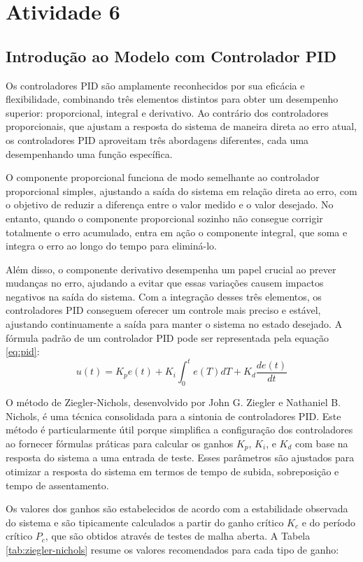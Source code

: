 \section{Atividade 6}
\subsection{Introdução ao Modelo com Controlador PID}
Os controladores PID são amplamente reconhecidos por sua eficácia e flexibilidade, combinando três elementos distintos para obter um desempenho superior: proporcional, integral e derivativo. Ao contrário dos controladores proporcionais, que ajustam a resposta do sistema de maneira direta ao erro atual, os controladores PID aproveitam três abordagens diferentes, cada uma desempenhando uma função específica.

O componente proporcional funciona de modo semelhante ao controlador proporcional simples, ajustando a saída do sistema em relação direta ao erro, com o objetivo de reduzir a diferença entre o valor medido e o valor desejado. No entanto, quando o componente proporcional sozinho não consegue corrigir totalmente o erro acumulado, entra em ação o componente integral, que soma e integra o erro ao longo do tempo para eliminá-lo.

Além disso, o componente derivativo desempenha um papel crucial ao prever mudanças no erro, ajudando a evitar que essas variações causem impactos negativos na saída do sistema. Com a integração desses três elementos, os controladores PID conseguem oferecer um controle mais preciso e estável, ajustando continuamente a saída para manter o sistema no estado desejado.
A fórmula padrão de um controlador PID pode ser representada pela equação \ref{eq:pid}:
\begin{equation}
u(t) = K_p e(t) + K_i \int_{0}^{t} e(T) dT + K_d \frac{d e(t)}{dt}
\label{eq:pid}
\end{equation}

O método de Ziegler-Nichols, desenvolvido por John G. Ziegler e Nathaniel B. Nichols, é uma técnica consolidada para a sintonia de controladores PID. Este método é particularmente útil porque simplifica a configuração dos controladores ao fornecer fórmulas práticas para calcular os ganhos \( K_p \), \( K_i \), e \( K_d \) com base na resposta do sistema a uma entrada de teste. Esses parâmetros são ajustados para otimizar a resposta do sistema em termos de tempo de subida, sobreposição e tempo de assentamento.

Os valores dos ganhos são estabelecidos de acordo com a estabilidade observada do sistema e são tipicamente calculados a partir do ganho crítico \( K_c \) e do período crítico \( P_c \), que são obtidos através de testes de malha aberta. A Tabela \ref{tab:ziegler-nichols} resume os valores recomendados para cada tipo de ganho:

